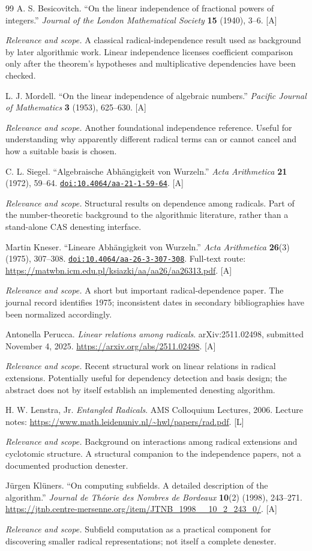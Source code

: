 \documentclass[11pt,oneside]{article}
\numberwithin{equation}{section}
\theoremstyle{definition}
\theoremstyle{remark}
\newcommand{\doi}[1]{\href{https://doi.org/#1}{\nolinkurl{doi:#1}}}
\newcommand{\status}[1]{\textsf{\small[#1]}}
\newcommand{\entrynote}[1]{\par\smallskip\noindent\emph{Relevance and scope.} #1}
\begin{document}
\begin{thebibliography}{99}
A. S. Besicovitch. ``On the linear independence of fractional powers of integers.'' \emph{Journal of the London Mathematical Society} \textbf{15} (1940), 3--6. \status{A}
\entrynote{A classical radical-independence result used as background by later algorithmic work. Linear independence licenses coefficient comparison only after the theorem's hypotheses and multiplicative dependencies have been checked.}

L. J. Mordell. ``On the linear independence of algebraic numbers.'' \emph{Pacific Journal of Mathematics} \textbf{3} (1953), 625--630. \status{A}
\entrynote{Another foundational independence reference. Useful for understanding why apparently different radical terms can or cannot cancel and how a suitable basis is chosen.}

C. L. Siegel. ``Algebraische Abh\"angigkeit von Wurzeln.'' \emph{Acta Arithmetica} \textbf{21} (1972), 59--64. \doi{10.4064/aa-21-1-59-64}. \status{A}
\entrynote{Structural results on dependence among radicals. Part of the number-theoretic background to the algorithmic literature, rather than a stand-alone CAS denesting interface.}

Martin Kneser. ``Lineare Abh\"angigkeit von Wurzeln.'' \emph{Acta Arithmetica} \textbf{26}(3) (1975), 307--308. \doi{10.4064/aa-26-3-307-308}. Full-text route: \url{https://matwbn.icm.edu.pl/ksiazki/aa/aa26/aa26313.pdf}. \status{A}
\entrynote{A short but important radical-dependence paper. The journal record identifies 1975; inconsistent dates in secondary bibliographies have been normalized accordingly.}

Antonella Perucca. \emph{Linear relations among radicals}. arXiv:2511.02498, submitted November 4, 2025. \url{https://arxiv.org/abs/2511.02498}. \status{A}
\entrynote{Recent structural work on linear relations in radical extensions. Potentially useful for dependency detection and basis design; the abstract does not by itself establish an implemented denesting algorithm.}

H. W. Lenstra, Jr. \emph{Entangled Radicals}. AMS Colloquium Lectures, 2006. Lecture notes: \url{https://www.math.leidenuniv.nl/~hwl/papers/rad.pdf}. \status{L}
\entrynote{Background on interactions among radical extensions and cyclotomic structure. A structural companion to the independence papers, not a documented production denester.}

J\"urgen Kl\"uners. ``On computing subfields. A detailed description of the algorithm.'' \emph{Journal de Th\'eorie des Nombres de Bordeaux} \textbf{10}(2) (1998), 243--271. \url{https://jtnb.centre-mersenne.org/item/JTNB_1998__10_2_243_0/}. \status{A}
\entrynote{Subfield computation as a practical component for discovering smaller radical representations; not itself a complete denester.}


\end{thebibliography}
\end{document}
